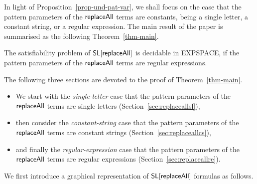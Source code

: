  

In light of Proposition~\ref{prop-und-pat-var}, we shall focus on the case that the pattern parameters of the $\mathsf{replaceAll}$ terms are constants, being a single letter, a constant string, or a regular expression. 
%
The main result of the paper is summarised as the following Theorem~\ref{thm-main}.

\begin{theorem}\label{thm-main}
	The satisfiability problem of $\mathsf{SL}[\mathsf{replaceAll}]$ is decidable in EXPSPACE, if the pattern parameters of the $\mathsf{replaceAll}$ terms are regular expressions.  
\end{theorem}

The following three sections are devoted to the proof of Theorem~\ref{thm-main}.  
\begin{itemize}
\item We start with the \emph{single-letter} case that the pattern parameters of the $\mathsf{replaceAll}$ terms are single letters (Section~\ref{sec:replaceallsl}),
\item then consider the \emph{constant-string} case that the pattern parameters of the $\mathsf{replaceAll}$ terms are constant strings  (Section~\ref{sec:replaceallcs}), \item and finally the \emph{regular-expression} case that the pattern parameters of the $\mathsf{replaceAll}$ terms are regular expressions  (Section~\ref{sec:replaceallre}).
\end{itemize}




We first introduce a graphical representation of $\mathsf{SL}[\mathsf{replaceAll}]$ formulas as follows.    

